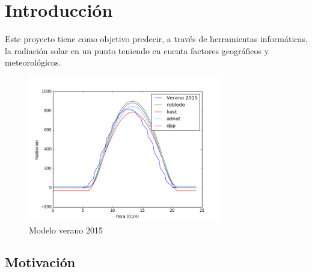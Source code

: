 \cleardoublepage

\chapter{Introducción}
\label{makereference}

Este proyecto tiene como objetivo predecir, a través de herramientas informáticas, la radiación solar en un punto teniendo en cuenta factores geográficos y meteorológicos.


\begin{figure}[htb]%
	
	\begin{center}
		\includegraphics[height=2.5in]{figures/verano2015.png}
		\caption{Modelo verano 2015}
	\end{center}
    
    \label{figure1}
\end{figure}


\section{Motivación}
\label{makereference1.1}

